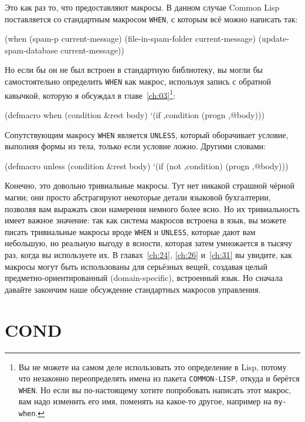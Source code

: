 Это как раз то, что предоставляют макросы. В данном случае Common Lisp поставляется со
стандартным макросом \lstinline{WHEN}, с которым всё можно написать так:

\begin{myverb}
(when (spam-p current-message)
  (file-in-spam-folder current-message)
  (update-spam-database current-message))
\end{myverb}

Но если бы он не был встроен в стандартную библиотеку, вы могли бы самостоятельно
определить \lstinline{WHEN} как макрос, используя запись с обратной кавычкой, которую я
обсуждал в главе~\ref{ch:03}\footnote{Вы не можете на самом деле использовать это определение в
  Lisp, потому что незаконно переопределять имена из пакета \lstinline{COMMON-LISP}, откуда и
  берётся \lstinline{WHEN}. Но если вы по-настоящему хотите попробовать написать этот макрос,
  вам надо изменить его имя, поменять на какое-то другое, например на \lstinline{my-when}.}:

\begin{myverb}
(defmacro when (condition &rest body)
  `(if ,condition (progn ,@body)))
\end{myverb}

Сопутствующим макросу \lstinline{WHEN} является \lstinline{UNLESS}, который оборачивает условие,
выполняя формы из тела, только если условие ложно. Другими словами:

\begin{myverb}
(defmacro unless (condition &rest body)
  `(if (not ,condition) (progn ,@body)))
\end{myverb}

Конечно, это довольно тривиальные макросы. Тут нет никакой страшной чёрной магии; они
просто абстрагируют некоторые детали языковой бухгалтерии, позволяя вам выражать свои
намерения немного более ясно. Но их тривиальность имеет важное значение: так как система
макросов встроена в язык, вы можете писать тривиальные макросы вроде \lstinline{WHEN} и
\lstinline{UNLESS}, которые дают вам небольшую, но реальную выгоду в ясности, которая затем
умножается в тысячу раз, когда вы используете их. В главах~\ref{ch:24}, \ref{ch:26}
и~\ref{ch:31} вы увидите, как макросы могут быть использованы для серьёзных вещей,
создавая целый предметно-ориентированный (domain-specific), встроенный язык. Но сначала
давайте закончим наше обсуждение стандартных макросов управления.

\section{COND}

